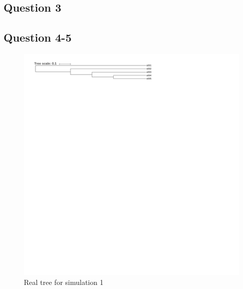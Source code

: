 \documentclass[]{article}
\theoremstyle{definition}
\begin{document}
\subsection{Question 3}



\subsection{Question 4-5}

\begin{figure}[H]
	\includegraphics*[width = \linewidth]{image/tree_1_true.pdf}
	\caption{ Real tree for simulation 1 }
\end{figure}
\end{document}
